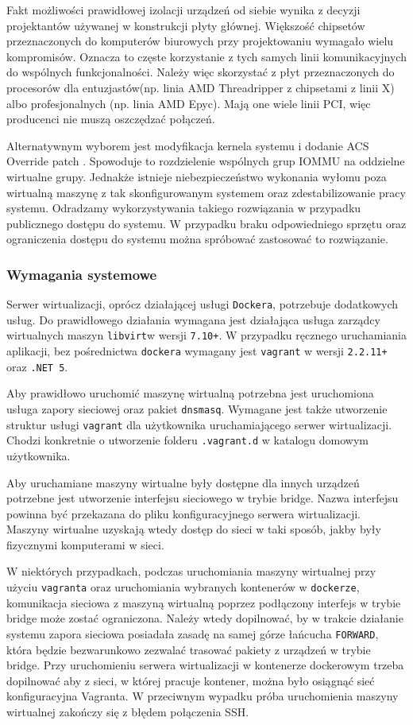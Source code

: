 \documentclass[../opis-rozwiazania.tex]{subfiles}
\begin{document}
Fakt możliwości prawidłowej izolacji urządzeń od siebie wynika z decyzji projektantów używanej w konstrukcji płyty głównej.
Większość chipsetów przeznaczonych do komputerów biurowych przy projektowaniu wymagało wielu kompromisów.
Oznacza to częste korzystanie z tych samych linii komunikacyjnych do wspólnych funkcjonalności.
Należy więc skorzystać z płyt przeznaczonych do procesorów dla entuzjastów(np. linia AMD Threadripper z chipsetami z linii X) albo profesjonalnych (np. linia AMD Epyc).
Mają one wiele linii PCI, więc producenci nie muszą oszczędzać połączeń.

Alternatywnym wyborem jest modyfikacja kernela systemu i dodanie ACS Override patch \parencite{acs-override}.
Spowoduje to rozdzielenie wspólnych grup IOMMU na oddzielne wirtualne grupy.
Jednakże istnieje niebezpieczeństwo wykonania wyłomu poza wirtualną maszynę z tak skonfigurowanym systemem oraz zdestabilizowanie pracy systemu.
Odradzamy wykorzystywania takiego rozwiązania w przypadku publicznego dostępu do systemu.
W przypadku braku odpowiedniego sprzętu oraz ograniczenia dostępu do systemu można spróbować zastosować to rozwiązanie.

\subsubsection{Wymagania systemowe}
Serwer wirtualizacji, oprócz działającej usługi \texttt{Dockera}, potrzebuje dodatkowych usług.
Do prawidłowego działania wymagana jest działająca usługa zarządcy wirtualnych maszyn \texttt{libvirt}w wersji \texttt{7.10+}. W przypadku ręcznego uruchamiania aplikacji, bez pośrednictwa \texttt{dockera} wymagany jest \texttt{vagrant} w wersji \texttt{2.2.11+} oraz \texttt{.NET 5}.

Aby prawidłowo uruchomić maszynę wirtualną potrzebna jest uruchomiona usługa zapory sieciowej oraz pakiet \texttt{dnsmasq}.
Wymagane jest także utworzenie struktur usługi \texttt{vagrant} dla użytkownika uruchamiającego serwer wirtualizacji.
Chodzi konkretnie o utworzenie folderu \texttt{.vagrant.d} w katalogu domowym użytkownika.

Aby uruchamiane maszyny wirtualne były dostępne dla innych urządzeń potrzebne jest utworzenie interfejsu sieciowego w trybie bridge.
Nazwa interfejsu powinna być przekazana do pliku konfiguracyjnego serwera wirtualizacji.
Maszyny wirtualne uzyskają wtedy dostęp do sieci w taki sposób, jakby były fizycznymi komputerami w sieci.

W niektórych przypadkach, podczas uruchomiania maszyny wirtualnej przy użyciu \texttt{vagranta} oraz uruchomiania wybranych kontenerów w \texttt{dockerze}, komunikacja sieciowa z maszyną wirtualną poprzez podłączony interfejs w trybie bridge może zostać ograniczona.
Należy wtedy dopilnować, by w trakcie działanie systemu zapora sieciowa posiadała zasadę na samej górze łańcucha \texttt{FORWARD}, która będzie bezwarunkowo zezwalać trasować pakiety z urządzeń w trybie bridge.
Przy uruchomieniu serwera wirtualizacji w kontenerze dockerowym trzeba dopilnować aby z sieci, w której pracuje kontener, można było osiągnąć sieć konfiguracyjna Vagranta.
W przeciwnym wypadku próba uruchomienia maszyny wirtualnej zakończy się z błędem połączenia SSH.
\end{document}

